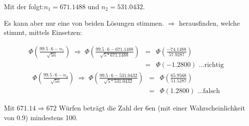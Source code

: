 \begin{uebsp}
\begin{Answer}
Mit der  folgt:$n_1=671.1488$ und $n_2=531.0432$.

Es kann aber nur eine von beiden Lösungen stimmen. $\Rightarrow$ herausfinden, welche stimmt, mittels Einsetzen:

\begin{eqnarray*}\Phi\left(\frac{99.5\cdot 6-n_1}{\sqrt{5n}}\right)\;\Rightarrow\;\Phi\left(\frac{99.5\cdot 6-671.1488}{\sqrt{5*671.1488}}\right) &=& \Phi\left(\frac{-74.1488}{57.9287}\right)\\&=&\Phi(-1.2800)\text{ ...richtig}\end{eqnarray*}
\begin{eqnarray*}\Phi\left(\frac{99.5\cdot 6-n_2}{\sqrt{5n}}\right)\;\Rightarrow\;\Phi\left(\frac{99.5\cdot 6-531.0432}{\sqrt{5*531.0432}}\right) &=& \Phi\left(\frac{65.9568}{51.5287}\right)\\&=&\Phi(1.2800)\text{ ...falsch}\end{eqnarray*}

Mit $671.14\Rightarrow672$ Würfen beträgt die Zahl der 6en (mit einer Wahrscheinlichkeit von 0.9) mindestens 100.
\end{Answer}
\end{uebsp}
